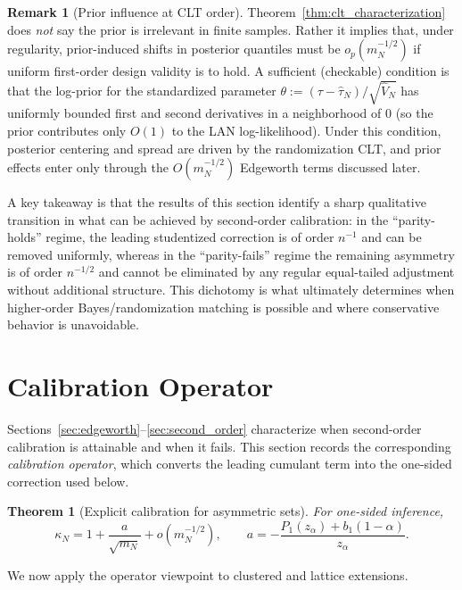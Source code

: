 \documentclass[aos]{imsart}
\newtheorem{theorem}{Theorem}
\theoremstyle{definition}
\newtheorem{remark}{Remark}
\theoremstyle{plain}
\newcommand{\mN}{m_N}
\newcommand{\tauN}{\hat{\tau}_N}
\newcommand{\VN}{\hat V_N}
\begin{document}
\begin{remark}[Prior influence at CLT order]\label{rem:prior_rate}
Theorem~\ref{thm:clt_characterization} does \emph{not} say the prior is irrelevant in finite samples.
Rather it implies that, under regularity, prior-induced shifts in posterior quantiles must be
$o_p(\mN^{-1/2})$ if uniform first-order design validity is to hold.
A sufficient (checkable) condition is that the log-prior for the standardized parameter
$\theta:=(\tau-\tauN)/\sqrt{\VN}$ has uniformly bounded first and second derivatives in a neighborhood of $0$
(so the prior contributes only $O(1)$ to the LAN log-likelihood).  Under this condition,
posterior centering and spread are driven by the randomization CLT, and prior effects enter only through
the $O(\mN^{-1/2})$ Edgeworth terms discussed later.
\end{remark}

\medskip
A key takeaway is that the results of this section identify a sharp qualitative transition in what can be achieved by second-order calibration: in the ``parity-holds'' regime, the leading studentized correction is of order $n^{-1}$ and can be removed uniformly, whereas in the ``parity-fails'' regime the remaining asymmetry is of order $n^{-1/2}$ and cannot be eliminated by any regular equal-tailed adjustment without additional structure.
This dichotomy is what ultimately determines when higher-order Bayes/randomization matching is possible and where conservative behavior is unavoidable.

\section{Calibration Operator}\label{sec:calibration}
Sections~\ref{sec:edgeworth}--\ref{sec:second_order} characterize when second-order calibration is attainable and when it fails.
This section records the corresponding \emph{calibration operator}, which converts the leading cumulant term into the one-sided correction used below.

\begin{theorem}[Explicit calibration for asymmetric sets]\label{thm:calibration}
For one-sided inference,
\[
\kappa_N
=
1 + \frac{a}{\sqrt{\mN}} + o(\mN^{-1/2}),
\qquad
a
=
-
\frac{P_1(z_\alpha) + b_1(1-\alpha)}{z_\alpha}.
\]
\end{theorem}
We now apply the operator viewpoint to clustered and lattice extensions.
\end{document}
